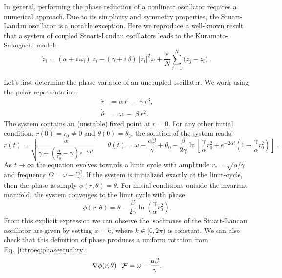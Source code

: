 In general, performing the phase reduction of a nonlinear oscillator requires a numerical approach.
Due to its simplicity and symmetry properties, the Stuart-Landau oscillator is a notable exception.
Here we reproduce a well-known result that a system of coupled Stuart-Landau oscillators
leads to the Kuramoto-Sakaguchi model:
\begin{equation}
\dot{z}_{i} = (\alpha + i\,\omega_{i})\,z_{i}
             - (\gamma + i\,\beta)\,\lvert z_{i}\rvert^{2}z_{i}
             + \frac{\varepsilon}{N}\sum_{j=1}^{N}\bigl(z_{j}-z_{i}\bigr)\;.
\end{equation}

Let's first determine the phase variable of an uncoupled oscillator.
We work using the polar representation:
\begin{align}
  \dot{r}      &= \alpha\,r \;-\; \gamma\,r^{3},\\
  \dot{\theta} &= \omega \;-\; \beta\,r^{2}.
\end{align}
The system contains an (unstable) fixed point at $r=0$.
For any other initial condition, $r(0)=r_0\neq 0$ and $\theta(0)=\theta_0$, the solution of the system reads:
\begin{equation}
    r(t) = \sqrt{\frac{\alpha}{\gamma + \left(\frac{\alpha}{r_0^2}-\gamma\right)e^{-2\alpha t}}}
    \qquad
    \theta(t) = \omega - \frac{\alpha\beta}{\gamma} +\theta_0 
    - \frac{\beta}{2\gamma} \ln\left[ \frac{\gamma}{\alpha} r_0^2 + e^{-2\alpha t}\left(1-\frac{\gamma}{\alpha}r_0^2 \right)\right]\;. 
\end{equation}
As $t\to\infty$ the equation evolves towards a limit cycle with amplitude $r_* = \sqrt{\alpha/\gamma}$ and frequency 
$\Omega = \omega - \frac{\alpha\beta}{\gamma}$.
If  the system is initialized exactly at the limit-cycle, then the phase is simply $\phi(r,\theta) = \theta$.
For initial conditions outside the invariant manifold, the system converges to the limit cycle with phase
$$\phi(r,\theta) = \theta - \frac{\beta}{2\gamma}\ln\left(\frac{\gamma}{\alpha} r_0^2 \right).$$
From this explicit expression we can observe the isochrones of the Stuart-Landau oscillator are given by
setting $\phi = k$, where $k\in[0,2\pi)$ is constant.
We can also check that this definition of phase produces a uniform rotation from Eq.~\eqref{introeq:phaseequality}:
 $$\nabla \phi(r,\theta)\cdot \boldsymbol{\mathcal{F}} = \omega - \frac{\alpha \beta }{\gamma}.$$

